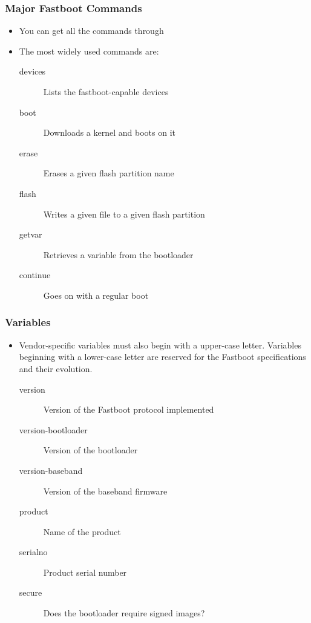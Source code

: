 \begin{frame}
  \frametitle{Major Fastboot Commands}
  \begin{itemize}
  \item You can get all the commands through 
  \item The most widely used commands are:
    \begin{description}
    \item[devices] Lists the fastboot-capable devices
    \item[boot] Downloads a kernel and boots on it
    \item[erase] Erases a given flash partition name
    \item[flash] Writes a given file to a given flash partition
    \item[getvar] Retrieves a variable from the bootloader
    \item[continue] Goes on with a regular boot
    \end{description}
  \end{itemize}
\end{frame}

\begin{frame}
  \frametitle{ Variables}
  \begin{itemize}
  \item Vendor-specific variables must also begin with a upper-case
    letter. Variables beginning with a lower-case letter are reserved
    for the Fastboot specifications and their evolution.
    \begin{description}
    \item[version] Version of the Fastboot protocol implemented
    \item[version-bootloader] Version of the bootloader
    \item[version-baseband] Version of the baseband firmware
    \item[product] Name of the product
    \item[serialno] Product serial number
    \item[secure] Does the bootloader require signed images?
    \end{description}
  \end{itemize}
\end{frame}
